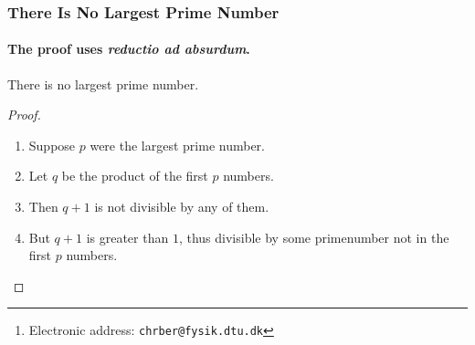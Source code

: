 \documentclass[a4paper,twoside]{beamer}
\title{}
\author[1]{Christian Berrig%
\thanks{Electronic address: \texttt{chrber@fysik.dtu.dk}}}
\affil[1]{BigQ, QPIT, DTU}
\date{\today}
\begin{document}
\maketitle


\begin{frame}
\frametitle{There Is No Largest Prime Number}
\framesubtitle{The proof uses \textit{reductio ad absurdum}.}
\begin{theorem}
There is no largest prime number.
\end{theorem}
\begin{proof}
\begin{enumerate}
\item<1-| alert@1> Suppose $p$ were the largest prime number.
\item<2-> Let $q$ be the product of the first $p$ numbers.
\item<3-> Then $q+1$ is not divisible by any of them.
\item<1-> But $q + 1$ is greater than $1$, thus divisible by some primenumber not in the first $p$ numbers.\qedhere
\end{enumerate}
\end{proof}
\end{frame}

\printbibliography      %
\end{document}
